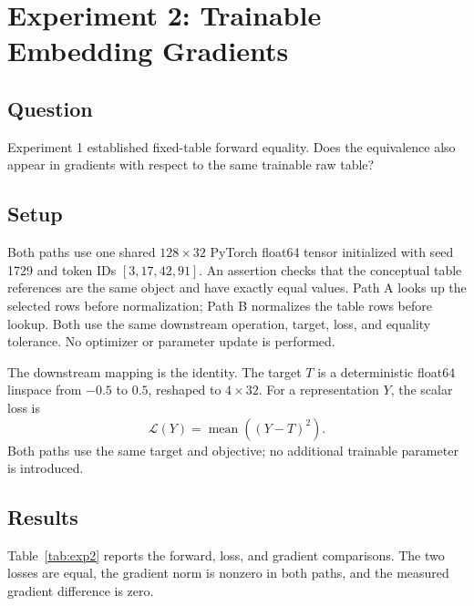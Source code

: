 \documentclass[conference]{IEEEtran}
\begin{document}
\section{Experiment 2: Trainable Embedding Gradients}
\subsection{Question}
Experiment 1 established fixed-table forward equality. Does the equivalence also appear in gradients with respect to the same trainable raw table?

\subsection{Setup}
Both paths use one shared \(128\times32\) PyTorch float64 tensor initialized with seed 1729 and token IDs \([3,17,42,91]\). An assertion checks that the conceptual table references are the same object and have exactly equal values. Path A looks up the selected rows before normalization; Path B normalizes the table rows before lookup. Both use the same downstream operation, target, loss, and equality tolerance. No optimizer or parameter update is performed.

The downstream mapping is the identity. The target \(T\) is a deterministic float64 linspace from \(-0.5\) to \(0.5\), reshaped to \(4\times32\). For a representation \(Y\), the scalar loss is
\begin{equation}
\mathcal{L}(Y)=\operatorname{mean}\!\left((Y-T)^2\right).
\label{eq:loss}
\end{equation}
Both paths use the same target and objective; no additional trainable parameter is introduced.

\subsection{Results}
Table~\ref{tab:exp2} reports the forward, loss, and gradient comparisons. The two losses are equal, the gradient norm is nonzero in both paths, and the measured gradient difference is zero.
\end{document}
